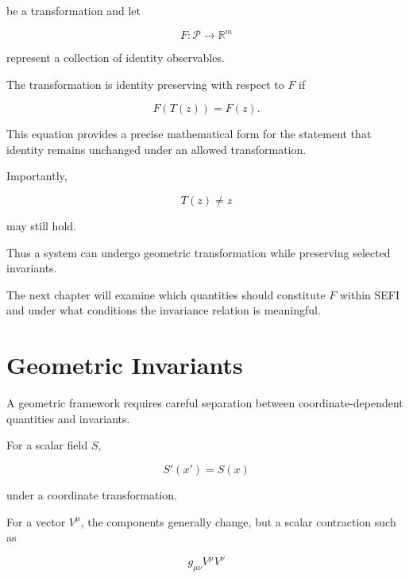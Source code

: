 \documentclass[12pt,oneside]{book}
\begin{document}
be a transformation and let

\begin{equation}
    F:
    \mathcal{P}
    \rightarrow
    \mathbb{R}^m
\end{equation}

represent a collection of identity observables.

The transformation is identity preserving with respect to \(F\)
if

\begin{equation}
    F(T(z))
    =
    F(z).
    \label{eq:identity-preserving-transformation}
\end{equation}

This equation provides a precise mathematical form for the
statement that identity remains unchanged under an allowed
transformation.

Importantly,

\begin{equation}
    T(z)
    \neq
    z
\end{equation}

may still hold.

Thus a system can undergo geometric transformation while
preserving selected invariants.

The next chapter will examine which quantities should constitute
\(F\) within SEFI and under what conditions the invariance
relation is meaningful.


\section{Geometric Invariants}
\label{sec:geometric-invariants}

A geometric framework requires careful separation between
coordinate-dependent quantities and invariants.

For a scalar field \(S\),

\begin{equation}
    S'(x')
    =
    S(x)
\end{equation}

under a coordinate transformation.

For a vector \(V^\mu\), the components generally change, but a
scalar contraction such as

\begin{equation}
    g_{\mu\nu}
    V^\mu V^\nu
    \label{eq:vector-scalar-invariant}
\end{equation}
\end{document}

